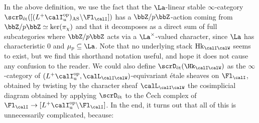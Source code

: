 \documentclass[10pt, reqno]{amsart}
\theoremstyle{plain}
\theoremstyle{definition}
\numberwithin{equation}{section}
\begin{document}
In the above definition, we use the fact that the $\La$-linear stable $\infty$-category $\scrD_{\mathrm{\acute{e}t}}([(L^+\calI_u^{\mathrm{op}})_{\mathrm{AS}}\backslash \Fl_{\calI}])$ has a $\bbZ/p\bbZ$-action coming from $\bbZ/p\bbZ \simeq \mathrm{ker}(\pi_\chi)$ and that it decomposes as a direct sum of full subcategories where $\bbZ/p\bbZ$ acts via a $\La^\times$-valued character, since $\La$ has characteristic $0$ and $\mu_p\subseteq \La$.
Note that no underlying stack $\mathrm{Hk}_{\calI\calW}$ seems to exist, but we find this shorthand notation useful, and hope it does not cause any confusion to the reader. We could also define $\scrD_{\mathrm{\acute{e}t}}(\Hk_{\calI\calW})$ as the $\infty$-category of $(L^+\calI_{\mathrm{u}}^{\mathrm{op}},\calL_{\calI\calW})$-equivariant étale sheaves on $\Fl_{ \calI}$,
obtained by twisting by the character sheaf $\calL_{\calI\calW}$ the cosimplicial diagram obtained by applying $\scrD_{\mathrm{\acute{e}t}}$ to the \v{C}ech complex of $\Fl_{ \calI} \to [L^+\calI_{\mathrm{u}}^{\mathrm{op}}\backslash \Fl_{ \calI}]$. In the end, it turns out that all of this is unnecessarily complicated, because:
\end{document}
